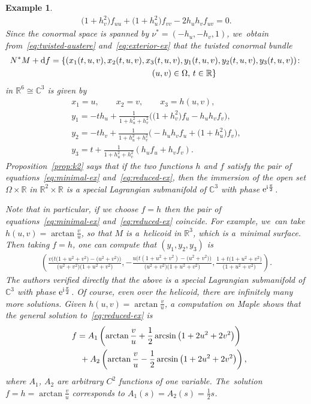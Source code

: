 \documentclass[pdftex]{sigma}
\def\R{\mathbb{R}}
\def\C{\mathbb{C}}
\newtheorem{Example}[Theorem]{Example}
\numberwithin{equation}{section}
\begin{document}
\begin{Example}
\begin{gather} \label{eq:reduced-ex}
\big(1 + h_v^2\big) f_{uu} + \big(1 + h_u^2\big) f_{vv} - 2 h_u h_v f_{uv} = 0.
\end{gather}
Since the conormal space is spanned by $\nu^* = (-h_u, -h_v, 1)$, we~obtain from~\eqref{eq:twisted-austere} and~\eqref{eq:exterior-ex} that the twisted conormal bundle
\begin{gather*}
N^* M + {\rm d} f = \{(x_1(t,u,v), x_2(t,u,v), x_3(t,u,v), y_1(t,u,v), y_2(t,u,v), y_3(t,u,v))\colon
\\ \hphantom{N^* M + {\rm d} f = \{}
(u,v) \in \Omega,\, t \in \R \}
\end{gather*}
in $\R^6 \cong \C^3$ is given by
\begin{gather*}
x_1 = u, \qquad
x_2 = v, \qquad
x_3 = h(u,v), \\
y_1 = -t h_u + \frac{1}{1 + h_u^2 + h_v^2} \big( \big(1 + h_v^2\big) f_u - h_u h_v f_v\big), \\
y_2 = -t h_v + \frac{1}{1 + h_u^2 + h_v^2} \big({-}h_u h_v f_u + \big(1 + h_u^2\big) f_v \big), \\
y_3 = t + \frac{1}{1 + h_u^2 + h_v^2} (h_u f_u + h_v f_v).
\end{gather*}
Proposition~\ref{prop:k2} says that if the two functions $h$ and $f$ satisfy the pair of equations~\eqref{eq:minimal-ex} and~\eqref{eq:reduced-ex}, then the immersion of the open set $\Omega \times \R$ in $\R^2 \times \R$ is a special Lagrangian submanifold of $\C^3$ with phase ${\rm e}^{{\rm i} \frac{\pi}{2}}$.

Note that in particular, if we choose $f=h$ then the pair of equations~\eqref{eq:minimal-ex} and~\eqref{eq:reduced-ex} coincide. For example, we~can take $h(u,v) = \arctan{\frac{v}{u}}$, so that $M$ is a~helicoid in $\R^3$, which is a~minimal surface. Then taking $f = h$, one can compute that $(y_1, y_2, y_3)$ is
\begin{gather*}
\left(\frac{v \big(t\big(1+u^2+v^2\big)-\big(u^2+v^2\big) \big)}{\big(u^2+v^2\big)\big(1+u^2+v^2\big)},
-\frac{u \big(t(1+u^2+v^2)-\big(u^2+v^2\big) \big)}{\big(u^2+v^2\big)\big(1+u^2+v^2\big)},
\frac{1 + t\big(1+u^2+v^2\big)}{\big(1+u^2+v^2\big)} \right).
\end{gather*}
The authors verified directly that the above is a special Lagrangian submanifold of $\C^3$ with phase ${\rm e}^{{\rm i} \frac{\pi}{2}}$. Of course, even over the helicoid, there are infinitely many more solutions. Given $h(u,v) = \arctan{\frac{v}{u}}$, a computation on Maple shows that the general solution to~\eqref{eq:reduced-ex} is
\begin{gather*}
f = A_1 \left( \arctan \frac{v}{u} + \frac{1}{2} \arcsin\big(1 + 2 u^2 + 2 v^2\big) \right)\\
\hphantom{f =}{}
 + A_2 \left( \arctan \frac{v}{u} - \frac{1}{2} \arcsin\big(1 + 2 u^2 + 2 v^2\big) \right),
\end{gather*}
where $A_1$, $A_2$ are arbitrary $C^2$ functions of one variable. The~solution $f=h=\arctan \frac{v}{u}$ corresponds to $A_1 (s) = A_2 (s) = \frac{1}{2} s$.
\end{Example}
\end{document}
